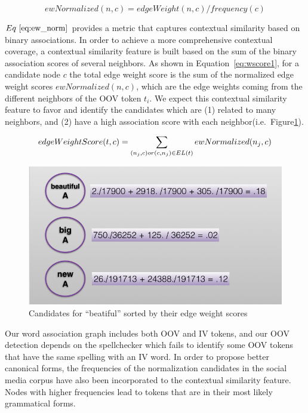 \documentclass[a4paper,onesided,12pt]{report}
\begin{document}
\begin{equation}
ewNormalized(n,c) = edgeWeight(n,c) / frequency(c)
\label{eq:ew_norm}
\end{equation}

$Eq~\ref{eq:ew_norm}$ provides a metric that captures contextual similarity based on binary associations.
In order to achieve a more comprehensive contextual coverage, a contextual similarity feature is built based on the sum of the binary association scores of several neighbors. As shown in Equation~\ref{eq:wscore1}, for a candidate node $c$ the total edge weight score is the sum of the normalized edge weight scores $ewNormalized(n,c)$, which are the edge weights coming from the different neighbors of the OOV token $t_i$. We expect this contextual similarity feature to favor and identify the candidates which are (1) related to many neighbors, and (2) have a high association score with each neighbor(i.e.~Figure\ref{fig:contextscores}).

\begin{equation}
edgeWeightScore(t,c) = \sum_{(n_j,c) or (c,n_j) \in EL(t)}{ewNormalized(n_j,c)} \\\\
\label{eq:wscore1}
\end{equation}

\begin{figure}[htb]
\begin{center}
\includegraphics[scale=0.5]{fig/contextScores}
\caption{Candidates for ``beatiful'' sorted by their edge weight scores}
\label{fig:contextscores}
\end{center}
\end{figure}

Our word association graph includes both OOV and IV tokens, and our OOV detection depends on the spellchecker which fails to identify some OOV tokens that have the same spelling with an IV word. In order to propose better canonical forms, the frequencies of the normalization candidates in the social media corpus have also been incorporated to the contextual similarity feature. Nodes with higher frequencies lead to tokens that are in their most likely grammatical forms.
\end{document}
